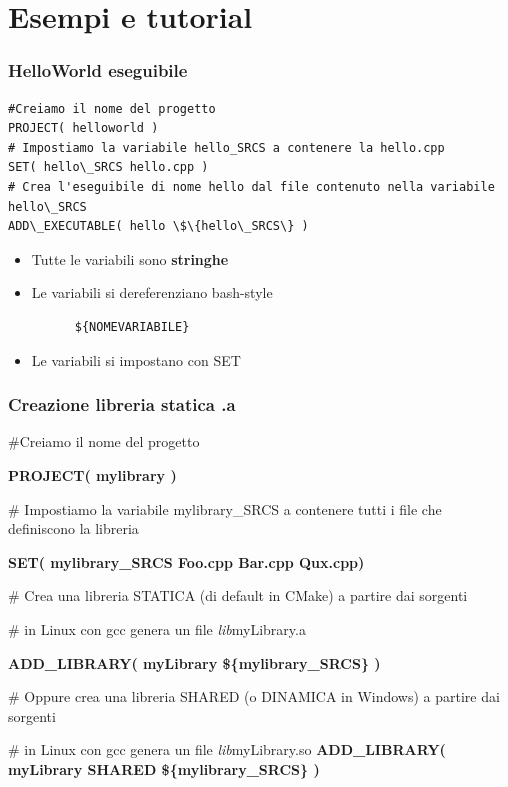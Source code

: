 \documentclass[10pt] {beamer}
\begin{document}

\section{Esempi e tutorial}

\begin{frame}[fragile]
\frametitle{HelloWorld eseguibile}
\begin{verbatim}
#Creiamo il nome del progetto
PROJECT( helloworld )
# Impostiamo la variabile hello_SRCS a contenere la hello.cpp
SET( hello\_SRCS hello.cpp )
# Crea l'eseguibile di nome hello dal file contenuto nella variabile hello\_SRCS
ADD\_EXECUTABLE( hello \$\{hello\_SRCS\} )
\end{verbatim}

\begin{itemize}
	\item Tutte le variabili sono \textbf{stringhe}
	\item Le variabili si dereferenziano bash-style 
	  \begin{verbatim}
	  ${NOMEVARIABILE} 
	  \end{verbatim}
	\item Le variabili si impostano con SET
\end{itemize}

\end{frame}


\begin{frame}
	\frametitle{Creazione libreria statica .a}
\begin{small}
\#Creiamo il nome del progetto

\textbf{PROJECT( mylibrary )}

\# Impostiamo la variabile mylibrary\_SRCS a contenere tutti i file che definiscono la libreria

\textbf{SET( mylibrary\_SRCS Foo.cpp Bar.cpp Qux.cpp)}

\# Crea una libreria STATICA (di default in CMake) a partire dai sorgenti

\# in Linux con gcc genera un file \emph{lib}myLibrary.a

\textbf{ADD\_LIBRARY( myLibrary \$\{mylibrary\_SRCS\} )}

\# Oppure crea una libreria SHARED (o DINAMICA in Windows) a partire dai sorgenti

\# in Linux con gcc genera un file \emph{lib}myLibrary.so
\textbf{ADD\_LIBRARY( myLibrary SHARED \$\{mylibrary\_SRCS\} )}
\end{small}
\end{frame}
\end{document}
